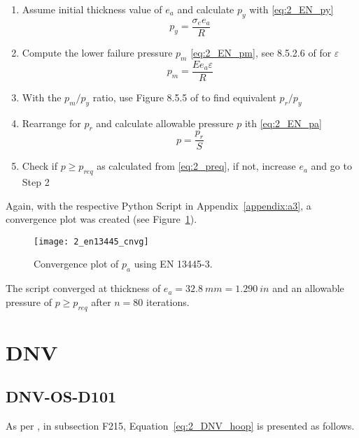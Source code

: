 \begin{enumerate}
	\item Assume initial thickness value of $e_a$ and calculate $p_y$ with \ref{eq:2_EN_py}
		\begin{equation}
			\label{eq:2_EN_py}
			p_y = \frac{\sigma_e e_a}{R}
		\end{equation}
	\item Compute the lower failure pressure $p_m$ \ref{eq:2_EN_pm}, see 8.5.2.6 of \cite{EN134453} for $\varepsilon$
		\begin{equation}
			\label{eq:2_EN_pm}
			p_m = \frac{E e_a  \varepsilon}{R}
		\end{equation}
	\item With the $p_m/p_y$ ratio, use Figure 8.5.5 of \cite{EN134453} to find equivalent $p_r/p_y$
	\item Rearrange for $p_r$ and calculate allowable pressure $p$ ith \ref{eq:2_EN_pa}
		\begin{equation}
			\label{eq:2_EN_pa}
			p = \frac{p_r}{S}
		\end{equation}
	\item Check if $p \geq p_{req}$ as calculated from \ref{eq:2_preq}, if not, increase $e_a$ and go to Step 2\\
\end{enumerate}

Again, with the respective Python Script in Appendix~\ref{appendix:a3}, a convergence plot was created (see Figure~\ref{fig:2_en13445_cnvg}).
\begin{figure}[H]
    \centering
    \texttt{[image: 2\_en13445\_cnvg]}
    \caption{Convergence plot of $p_a$ using EN 13445-3.}
    \label{fig:2_en13445_cnvg}
\end{figure}

The script converged at thickness of $e_a = 32.8\ mm = 1.290\ in$ and an allowable pressure of $p\geq p_{req}$ after $n=80$ iterations. 

\section{DNV}

\subsection{DNV-OS-D101}

As per \cite{DNVOSD101}, in subsection F215, Equation~\ref{eq:2_DNV_hoop} is presented as follows.

